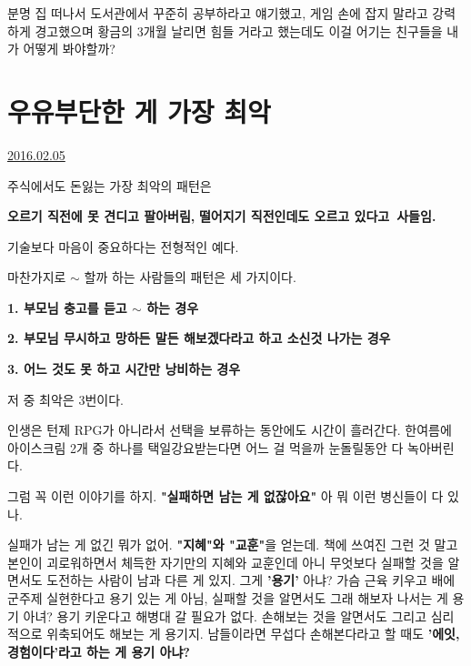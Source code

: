 분명 집 떠나서 도서관에서 꾸준히 공부하라고 얘기했고, 게임 손에 잡지 말라고 강력하게 경고했으며
황금의 3개월 날리면 힘들 거라고 했는데도 이걸 어기는 친구들을 내가 어떻게 봐야할까?
\vspace{5mm}














\section{우유부단한 게 가장 최악}
\href{https://www.kockoc.com/Apoc/624579}{2016.02.05}

\vspace{5mm}

주식에서도 돈잃는 가장 최악의 패턴은
\vspace{5mm}

\textbf{오르기 직전에 못 견디고 팔아버림,}
\textbf{떨어지기 직전인데도 오르고 있다고 사들임.}
\vspace{5mm}

기술보다 마음이 중요하다는 전형적인 예다.
\vspace{5mm}

마찬가지로 $\sim$ 할까 하는 사람들의 패턴은 세 가지이다.
\vspace{5mm}

\item \textbf{1. 부모님 충고를 듣고 $\sim$ 하는 경우}
\item \textbf{2. 부모님 무시하고 망하든 말든 해보겠다라고 하고 소신것 나가는 경우}
\item \textbf{3. 어느 것도 못 하고 시간만 낭비하는 경우}
\vspace{5mm}

저 중 최악은 3번이다.
\vspace{5mm}

인생은 턴제 RPG가 아니라서 선택을 보류하는 동안에도 시간이 흘러간다.
한여름에 아이스크림 2개 중 하나를 택일강요받는다면 어느 걸 먹을까 눈돌릴동안 다 녹아버린다.
\vspace{5mm}

그럼 꼭 이런 이야기를 하지. \textbf{"실패하면 남는 게 없잖아요"}
아 뭐 이런 병신들이 다 있나.
\vspace{5mm}

실패가 남는 게 없긴 뭐가 없어. \textbf{"지혜"와 "교훈"}을 얻는데.
책에 쓰여진 그런 것 말고 본인이 괴로워하면서 체득한 자기만의 지혜와 교훈인데
아니 무엇보다 실패할 것을 알면서도 도전하는 사람이 남과 다른 게 있지. 그게 \textbf{'용기'} 아냐?
가슴 근육 키우고 배에 군주제 실현한다고 용기 있는 게 아님, 실패할 것을 알면서도 그래 해보자 나서는 게 용기 아녀?
용기 키운다고 해병대 갈 필요가 없다. 손해보는 것을 알면서도 그리고 심리적으로 위축되어도 해보는 게 용기지.
남들이라면 무섭다 손해본다라고 할 때도 \textbf{'에잇, 경험이다'라고 하는 게 용기 아냐?}
\vspace{5mm}

